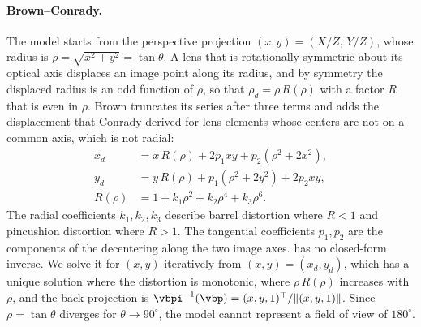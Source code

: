 \paragraph{Brown--Conrady.} The model starts from the perspective
projection $(x,y)=(X/Z,\,Y/Z)$, whose radius is
$\rho=\sqrt{x^2+y^2}=\tan\theta$. A lens that is rotationally
symmetric about its optical axis displaces an image point along its
radius, and by symmetry the displaced radius is an odd function of
$\rho$, so that $\rho_d=\rho\,R(\rho)$ with a factor $R$ that is even
in $\rho$. Brown \cite{Brown1966DecenteringDO} truncates its series
after three terms and adds the displacement that Conrady
\cite{Conrady1919DecentredL} derived for lens elements whose centers
are not on a common axis, which is not radial:
\begin{align}
\label{eq:supp-brown-conrady}
    x_d &= x\,R(\rho) + 2p_1xy + p_2(\rho^2+2x^2),\nonumber\\
    y_d &= y\,R(\rho) + p_1(\rho^2+2y^2) + 2p_2xy,\\
    R(\rho) &= 1+k_1\rho^2+k_2\rho^4+k_3\rho^6.\nonumber
\end{align}
The radial coefficients $k_1,k_2,k_3$ describe barrel distortion
where $R<1$ and pincushion distortion where $R>1$. The tangential
coefficients $p_1,p_2$ are the components of the decentering along
the two image axes.  has no closed-form
inverse. We solve it for $(x,y)$ iteratively from
$(x,y)=(x_d,y_d)$, which has a unique solution where the distortion is
monotonic, \ie where $\rho\,R(\rho)$ increases with $\rho$, and the
back-projection is
$\vbpi^{-1}(\vbp)=(x,y,1)^\top/\lVert(x,y,1)\rVert$. Since
$\rho=\tan\theta$ diverges for $\theta\to90^\circ$, the model cannot
represent a field of view of $180^\circ$.

